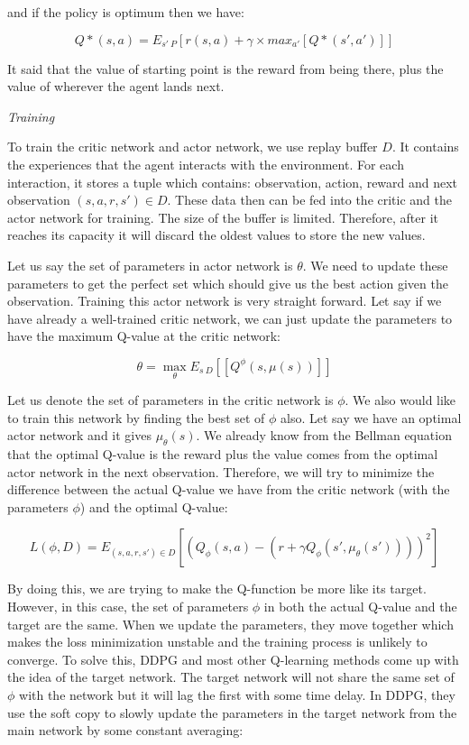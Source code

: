 \documentclass[conference]{IEEEtran}
\begin{document}
and if the policy is optimum then we have: 

\begin{equation}
    \label{eqn:optimum_Bellman_Q_function}
    Q*(s,a) = E_{s' ~ P} [r(s,a) + \gamma \times max_{a'} [Q*(s', a')]]
\end{equation}

It said that the value of starting point is the reward from being there, plus the value of wherever the agent lands next.

\textit{Training}

To train the critic network and actor network, we use replay buffer $D$. It contains the experiences that the agent interacts with the environment. For each interaction, it stores a tuple which contains: observation, action, reward and next observation $(s,a,r,s') \in D$. These data then can be fed into the critic and the actor network for training. The size of the buffer is limited. Therefore, after it reaches its capacity it will discard the oldest values to store the new values. 

Let us say the set of parameters in actor network is $\theta$. We need to update these parameters to get the perfect set which should give us the best action given the observation. Training this actor network is very straight forward. Let say if we have already a well-trained critic network, we can just update the parameters to have the maximum Q-value at the critic network: 

\begin{equation}
    \theta = \max_\theta E_{s ~ D} [[Q^{\phi}(s, \mu(s))]]
\end{equation}

Let us denote the set of parameters in the critic network is $\phi$. We also would like to train this network by finding the best set of $\phi$ also. Let say we have an optimal actor network and it gives $\mu_\theta(s)$. We already know from the Bellman equation that the optimal Q-value is the reward plus the value comes from the optimal actor network in the next observation. Therefore, we will try to minimize the difference between the actual Q-value we have from the critic network (with the parameters $\phi$) and the optimal Q-value: 

\begin{equation}
    L(\phi, D) = E_{(s,a,r,s') \in D}  [(Q_\phi(s,a) - (r + \gamma Q_\phi(s',\mu_\theta(s'))))^2]  
\end{equation}

By doing this, we are trying to make the Q-function be more like its target. However, in this case, the set of parameters $\phi$ in both the actual Q-value and the target are the same. When we update the parameters, they move together which makes the loss minimization unstable and the training process is unlikely to converge. To solve this, DDPG and most other Q-learning methods come up with the idea of the target network. The target network will not share the same set of $\phi$ with the network but it will lag the first with some time delay. In DDPG, they use the soft copy to slowly update the parameters in the target network from the main network by some constant averaging: 
\end{document}
